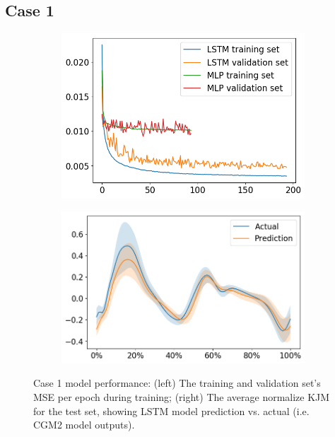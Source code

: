 \documentclass[../main.tex]{subfiles}
\begin{document}
\subsection{Case 1}
\label{sec:results-case1}

\begin{figure}[ht!]
     \centering
     \begin{subfigure}[b]{0.475\textwidth}
         \centering
         \includegraphics[width=\textwidth]{img/results/training_history/Case1_LSTMvsMLP_training.png}
     \end{subfigure}
     \hfill
     \begin{subfigure}[b]{0.515\textwidth}
         \centering
         \includegraphics[width=\textwidth]{img/results/test_prediction_evaluation/Case1_LSTM_test_prediction.png}
     \end{subfigure}
    \caption{Case 1 model performance: (left) The training and validation set's \ac{MSE} per epoch during training; (right) The average normalize \ac{KJM} for the test set, showing \ac{LSTM} model prediction vs. actual (i.e. CGM2 model outputs).}
    \label{fig:case1-performance-plots}
\end{figure}
\end{document}
